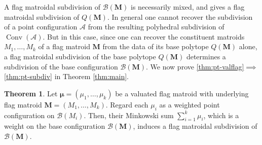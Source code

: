 \documentclass[11pt]{amsart}
\newcommand{\bb}{\mathcal B}
\newcommand{\be}{\mathbf e}
\newcommand{\MM}{{\boldsymbol M}}
\theoremstyle{definition}
\newtheorem{thm}{Theorem}[subsection]
\newtheorem{rem}[thm]{Remark}
\begin{document}
A flag matroidal subdivision of $\bb(\MM)$ is necessarily mixed, and gives a flag matroidal subdivision of $Q(\MM)$.  In general one cannot recover the subdivision of a point configuration $\mathcal A$ from the resulting polyhedral subdivision of $\operatorname{Conv}(\mathcal A)$.  But in this case, since one can recover the constituent matroids $M_1, \ldots, M_k$ of a flag matroid $\MM$ from the data of its base polytope $Q( \MM)$ alone, a flag matroidal subdivision of the base polytope $Q(\MM)$ determines a subdivision of the base configuration $\bb(\MM)$. We now prove \ref{thm:pt-valflag}$\implies$\ref{thm:pt-subdiv} in Theorem \ref{thm:main}.





\begin{thm}\label{thm:valflagsubdiv}
Let $\boldsymbol\mu=(\mu_1,\dots, \mu_k)$ be a valuated flag matroid with underlying flag matroid $\MM = (M_1, \ldots, M_k)$.  Regard each $\mu_i$ as a weighted point configuration on $\bb(M_i)$.  Then, their Minkowski sum $\sum_{i=1}^k \mu_i$, which is a weight on the base configuration $\bb(\MM)$, induces a flag matroidal subdivision of $\bb(\MM)$.
\end{thm}
\end{document}
